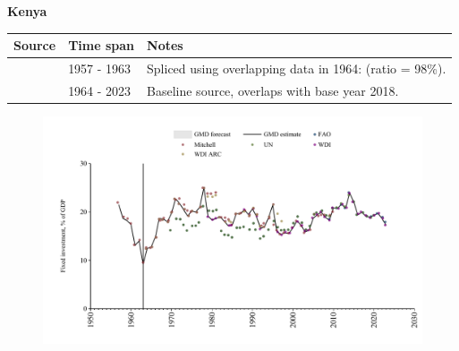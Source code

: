 \documentclass[12pt,a4paper,landscape]{article}
\begin{document}
\begin{adjustbox}{max totalsize={\paperwidth}{\paperheight},center}
\begin{minipage}[t][\textheight][t]{\textwidth}
\vspace*{0.5cm}
{}
\begin{center}
{\Large\bfseries Kenya}
\end{center}
\vspace{0.5cm}
\begin{table}[H]
\centering
\small
\begin{tabular}{|l|l|l|}
\hline
\textbf{Source} & \textbf{Time span} & \textbf{Notes} \\
\hline
\rowcolor{white}\cite{Mitchell}& 1957 - 1963 &Spliced using overlapping data in 1964: (ratio = 98\%).\\
\rowcolor{lightgray}\cite{WDI}& 1964 - 2023 &Baseline source, overlaps with base year 2018.\\
\hline
\end{tabular}
\end{table}
\begin{figure}[H]
\centering
\includegraphics[width=\textwidth,height=0.6\textheight,keepaspectratio]{graphs/KEN_finv_GDP.pdf}
\end{figure}
\end{minipage}
\end{adjustbox}
\end{document}
